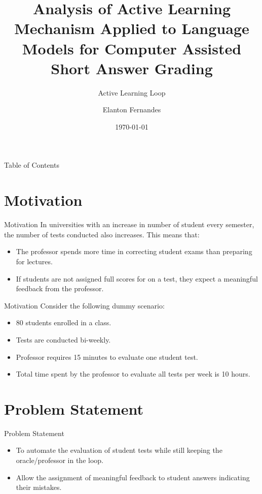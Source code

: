 \documentclass[aspectratio=169]{beamer}
\author[Name]{Elanton Fernandes}
\subtitle{Active Learning Loop}
\title{Analysis of Active Learning Mechanism Applied to Language Models for Computer Assisted Short Answer Grading}
\institute[HBRS]{Hochschule Bonn-Rhein-Sieg}
\date{\today}
\begin{document}
{
\begin{frame}
\titlepage
\end{frame}
\begin{frame}{Table of Contents}
\tableofcontents
\end{frame}
}


\section{Motivation}
\begin{frame}{Motivation}
	In universities with an increase in number of student every semester, the number of tests conducted also increases. This means that:
	\begin{itemize}
		\item The professor spends more time in correcting student exams than preparing for lectures.
		\item If students are not assigned full scores for on a test, they expect a meaningful feedback from the professor.
	\end{itemize}
\end{frame}
\begin{frame}{Motivation}
	Consider the following dummy scenario:
	\begin{itemize}
		\item 80 students enrolled in a class.
		\item Tests are conducted bi-weekly.
		\item Professor requires 15 minutes to evaluate one student test.
		\item Total time spent by the professor to evaluate all tests per week is 10 hours. 
	\end{itemize}
\end{frame}
\section{Problem Statement}
\begin{frame}{Problem Statement}
	\begin{itemize}
		\item To automate the evaluation of student tests while still keeping the oracle/professor in the loop.
		\item Allow the assignment of meaningful feedback to student answers indicating their mistakes.
	\end{itemize}
	
\end{frame}
\end{document}
